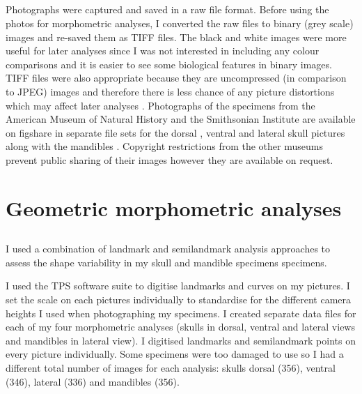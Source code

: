 \subsection{}
	Photographs were captured and saved in a raw file format. Before using the photos for morphometric analyses, I converted the raw files to binary (grey scale) images and re-saved them as TIFF files. The black and white images were more useful for later analyses since I was not interested in including any colour comparisons and it is easier to see some biological features in binary images. TIFF files were also appropriate because they are uncompressed (in comparison to JPEG) images and therefore there is less chance of any picture distortions which may affect later analyses \citep{HERC2013}.
	Photographs of the specimens from the American Museum of Natural History and the Smithsonian Institute are available on figshare in separate file sets for the dorsal \citep{Finlay2013d}, ventral \citep{Finlay2013v} and lateral \citep{Finlay2013l} skull pictures along with the mandibles \citep{Finlay2013m}. Copyright restrictions from the other museums prevent public sharing of their images however they are available on request.
	


\section{Geometric morphometric analyses}
\label{sect:morphometrics}

\subsection{}


	I used a combination of landmark and semilandmark analysis approaches to assess the shape variability in my skull and mandible specimens specimens. 

	I used the TPS software suite \citep{Rohlf2013} to digitise landmarks and curves on my pictures. I set the scale on each pictures individually to standardise for the different camera heights I used when photographing my specimens. I created separate data files for each of my four morphometric analyses (skulls in dorsal, ventral and lateral views and mandibles in lateral view). I digitised landmarks and semilandmark points on every picture individually. Some specimens were too damaged to use so I had a different total number of images for each analysis: skulls dorsal (356), ventral (346), lateral (336) and mandibles (356).

